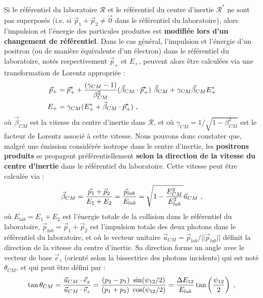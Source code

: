 \begin{refsection}
Si le référentiel du laboratoire $\mathcal{R}$ et le référentiel du centre d'inertie $\mathcal{R}^*$ ne sont pas superposés (i.e. si $\vec{p}_1+\vec{p}_2 \neq \vec{0}$ dans le référentiel du laboratoire), alors l'impulsion et l'énergie des particules produites est \textbf{modifiée lors d'un changement de référentiel}. Dans le cas général, l'impulsion et l'énergie d'un positron (ou de manière équivalente d'un électron) dans le référentiel du laboratoire, notés respectivement $\vec{p}_+$ et $E_+$, peuvent alors être calculées via une transformation de Lorentz appropriée \parencite{ribeyre_2017, furry_1955} :
\begin{equation}
\begin{split}
    \vec{p}_+   &= \vec{p}_+^* + \dfrac{(\gamma_{CM} - 1)}{\beta_{CM}^2} (\vec{\beta}_{CM} \cdot \vec{p}_+^*) ~ \vec{\beta}_{CM} + \gamma_{CM} \vec{\beta}_{CM} E_+^* \\
    E_+         &= \gamma_{CM} (E_+^* + \vec{\beta}_{CM} \cdot \vec{p}_+^*) ~ \rm ,
\end{split}
\label{eq:1-p+_E+_lab}
\end{equation}
où $\vec{\beta}_{CM}$ est la vitesse du centre d'inertie dans $\mathcal{R}$, et où $\gamma_{CM}=1/\sqrt{1-\beta_{CM}^2}$ est le facteur de Lorentz associé à cette vitesse. Nous pouvons donc constater que, malgré une émission considérée isotrope dans le centre d'inertie, les \textbf{positrons produits} se propagent préférentiellement \textbf{selon la direction de la vitesse du centre d'inertie} dans le référentiel du laboratoire. Cette vitesse peut être calculée via \parencite{ribeyre_2017} :
\begin{equation}
    \vec{\beta}_{CM}=\dfrac{\vec{p}_1+\vec{p}_2}{E_1+E_2}=\dfrac{\vec{p}_{lab}}{E_{lab}}=\sqrt{1-\dfrac{E_{CM}^2}{E_{lab}^2}} \vec{u}_{CM} ~ \rm ,
\end{equation}
où $E_{lab}=E_1+E_2$ est l'énergie totale de la collision dans le référentiel du laboratoire, $\vec{p}_{lab}=\vec{p}_1+\vec{p}_2$ est l'impulsion totale des deux photons dans le référentiel du laboratoire, et où le vecteur unitaire $\vec{u}_{CM}=\vec{p}_{lab}/||\vec{p}_{lab}||$ définit la direction de la vitesse du centre d'inertie. Sa direction forme un angle avec le vecteur de base $\vec{e}_z$ (orienté selon la bissectrice des photons incidents) qui est noté $\theta_{CM}$, et qui peut être défini par :
\begin{equation}
    \tan{\theta_{CM}} = \dfrac{\vec{u}_{CM} \cdot \vec{e}_x}{\vec{u}_{CM} \cdot \vec{e}_z} = \dfrac{(p_2- p_1) ~ \sin(\psi_{12}/2) }{(p_1+p_2) ~ \cos(\psi_{12}/2)}=\dfrac{\Delta E_{12}}{E_{lab}} \tan\left(\dfrac{\psi_{12}}{2}\right) ~ \rm ,

\end{equation}
\end{refsection}
